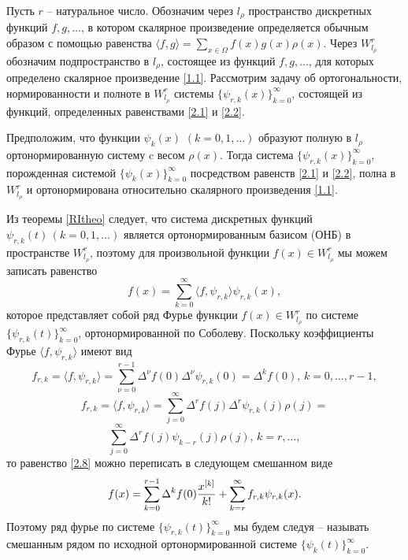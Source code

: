 Пусть $r$ -- натуральное число. Обозначим через $l_\rho$ пространство дискретных функций $f, g, \ldots$, в котором скалярное произведение определяется обычным образом с помощью равенства $\langle f,g\rangle = \sum\limits_{x\in\Omega}f(x)g(x)\rho(x)$.
Через $W^r_{l_\rho}$ обозначим подпространство в $l_\rho$, состоящее из функций $f, g, \ldots$, для которых определено скалярное произведение \eqref{1.1}.
Рассмотрим  задачу об ортогональности, нормированности и полноте в $W^r_{l_\rho}$ системы $\{\psi_{r,k}(x)\}_{k=0}^\infty$, состоящей из функций, определенных равенствами   \eqref{2.1} и \eqref{2.2}.

\begin{theorem}\label{RItheo}
Предположим, что функции $\psi_k(x)$ $(k=0,1,\ldots)$ образуют полную в $l_\rho$ ортонормированную систему  c весом   $\rho(x)$. Тогда система $\{\psi_{r,k}(x)\}_{k=0}^\infty$, порожденная системой $\{\psi_{k}(x)\}_{k=0}^\infty$
 посредством равенств \eqref{2.1} и \eqref{2.2}, полна  в $W^r_{l_\rho}$ и ортонормирована относительно скалярного произведения \eqref{1.1}.
\end{theorem}

Из теоремы \ref{RItheo} следует, что система дискретных функций $\psi_{r,k}(t)\, (k=0,1,\ldots)$
является ортонормированным базисом (ОНБ) в пространстве $W^r_{l_\rho}$, поэтому для произвольной функции $f(x)\in W^r_{l_\rho}$ мы можем записать равенство
  \begin{equation}\label{2.8}
 f(x)= \sum_{k=0}^\infty\langle f,\psi_{r,k}\rangle \psi_{r,k}(x),
  \end{equation}
которое представляет собой  ряд Фурье функции $f(x)\in W^r_{l_\rho}$ по системе
$\{\psi_{r,k}(t)\}_{k=0}^\infty$, ортонормированной по Соболеву. Поскольку коэффициенты Фурье $\langle f,\psi_{r,k}\rangle$ имеют  вид
\begin{equation}\label{2.9}
f_{r,k}=\langle f,\psi_{r,k}\rangle =\sum_{\nu=0}^{r-1}\Delta^\nu f(0)\Delta^\nu\psi_{r,k}(0)=\Delta^kf(0),\, k=0,\ldots, r-1,
 \end{equation}
 $$
f_{r,k}= \langle f,\psi_{r,k}\rangle =\sum_{j=0}^\infty\Delta^rf(j)\Delta^r\psi_{r,k}(j)\rho(j)=
 $$
\begin{equation}\label{2.10}
\sum_{j=0}^{\infty}\Delta^rf(j)\psi_{k-r}(j)\rho(j),\, k=r,\ldots,
 \end{equation}
то равенство \eqref{2.8} можно переписать в следующем  смешанном виде
  \begin{equation}\label{2.11}
 f(x)= \sum_{k=0}^{r-1}\Delta^kf(0){x^{[k]}\over k!} +\sum_{k=r}^\infty f_{r,k} \psi_{r,k}(x).
  \end{equation}
Поэтому ряд фурье по системе $\{\psi_{r,k}(t)\}_{k=0}^\infty$ мы будем следуя \cite{Shar9} --  \cite{SharII} называть смешанным рядом по исходной ортонормированной системе $\{\psi_{k}(t)\}_{k=0}^\infty$.


